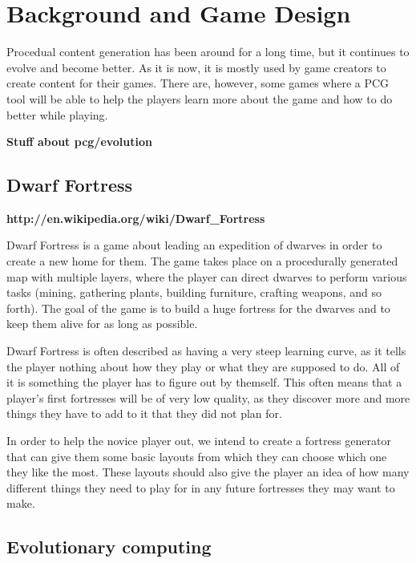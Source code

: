 \section{Background and Game Design}
\label{02}

Procedual content generation has been around for a long time, but it continues to evolve and become better. As it is now, it is mostly used by game creators to create content for their games. There are, however, some games where a PCG tool will be able to help the players learn more about the game and how to do better while playing.

\textbf{Stuff about pcg/evolution}

\subsection{Dwarf Fortress}

\textbf{http://en.wikipedia.org/wiki/Dwarf\_Fortress}

Dwarf Fortress is a game about leading an expedition of dwarves in order to create a new home for them. The game takes place on a procedurally generated map with multiple layers, where the player can direct dwarves to perform various tasks (mining, gathering plants, building furniture, crafting weapons, and so forth). The goal of the game is to build a huge fortress for the dwarves and to keep them alive for as long as possible.

Dwarf Fortress is often described as having a very steep learning curve, as it tells the player nothing about how they play or what they are supposed to do. All of it is something the player has to figure out by themself. This often means that a player's first fortresses will be of very low quality, as they discover more and more things they have to add to it that they did not plan for.

In order to help the novice player out, we intend to create a fortress generator that can give them some basic layouts from which they can choose which one they like the most. These layouts should also give the player an idea of how many different things they need to play for in any future fortresses they may want to make.


\subsection{Evolutionary computing}
\label{02_Evolution}

